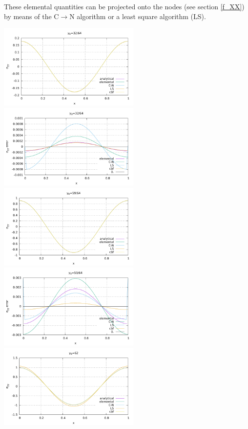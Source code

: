 These elemental quantities can be projected onto the nodes (see section \ref{f_XX})
by means of the C$\rightarrow$N algorithm or a least square algorithm (LS). 

\begin{center}
\includegraphics[width=7cm]{python_codes/fieldstone_27/results/32_64/sigmazz.pdf}
\includegraphics[width=7cm]{python_codes/fieldstone_27/results/32_64/sigmazz_error.pdf}\\
\includegraphics[width=7cm]{python_codes/fieldstone_27/results/59_64/sigmazz.pdf}
\includegraphics[width=7cm]{python_codes/fieldstone_27/results/59_64/sigmazz_error.pdf}\\
\includegraphics[width=7cm]{python_codes/fieldstone_27/results/62_64/sigmazz.pdf}

\end{center}
